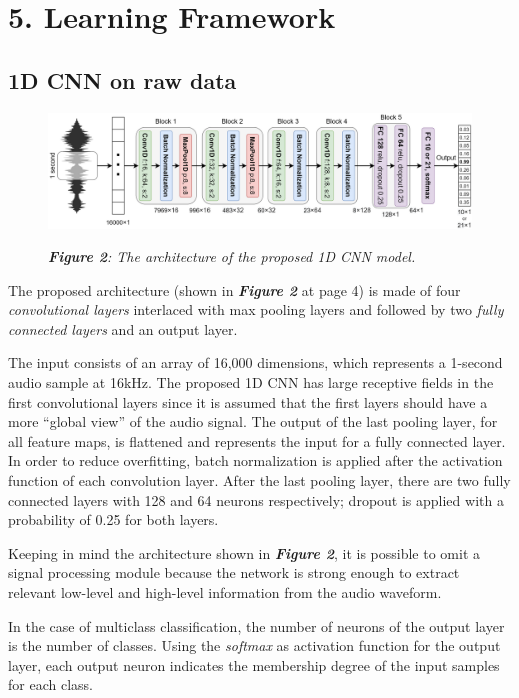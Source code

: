 \documentclass[conference]{IEEEtran}
\begin{document}
\section{5.	Learning Framework}
\subsection{1D CNN on raw data}

\begin{figure}
\centering
\includegraphics[scale=0.16]{1DCNN}

\begin{small}\textit{\textbf{Figure 2}: The architecture of the proposed 1D CNN model.}
\end{small}
\end{figure}

The proposed architecture (shown in \textbf{\textit{Figure 2}} at page 4) is made of four \textit{convolutional layers} interlaced with max pooling layers and followed by two \textit{fully connected layers} and an output layer.

The input consists of an array of 16,000 dimensions, which represents a 1-second audio sample at 16kHz.
The proposed 1D CNN has large receptive fields in the first convolutional layers since it is assumed that the first layers should have a more “global view” of the audio signal. The output of the last pooling layer, for all feature maps, is flattened and represents the input for a fully connected layer. In order to reduce overfitting, batch normalization is applied after the activation function of each convolution layer. After the last pooling layer, there are two fully connected layers with 128 and 64 neurons respectively; dropout is applied with a probability of 0.25 for both layers.

Keeping in mind the architecture shown in \textbf{\textit{Figure 2}}, it is possible to omit a signal processing module because the network is strong enough to extract relevant low-level and high-level information from the audio waveform.

In the case of multiclass classification, the number of neurons of the output layer is the number of classes. Using the \textit{softmax} as activation function for the output layer, each output neuron indicates the membership degree of the input samples for each class.
\end{document}
